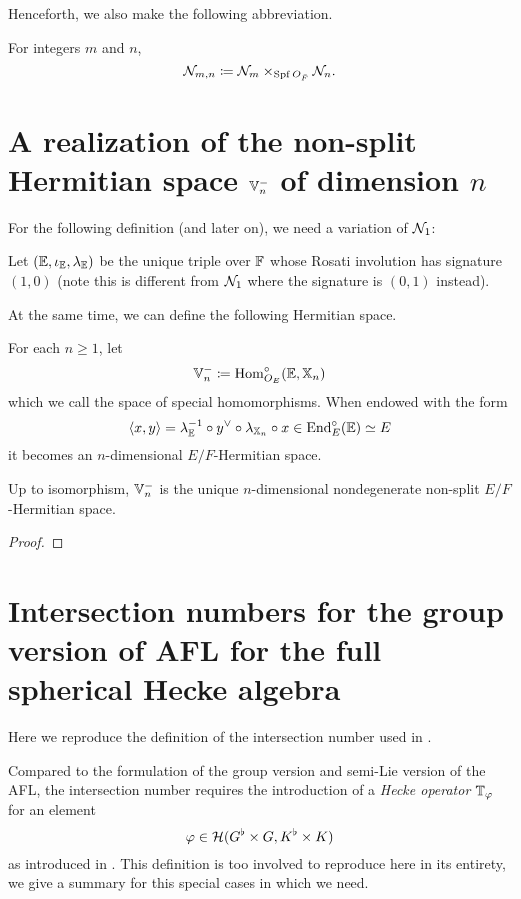 Henceforth, we also make the following abbreviation.
\begin{definition}
  For integers $m$ and $n$,
  \[ \mathcal N_{m,n} \coloneq \mathcal N_{m} \times_{\operatorname{Spf} O_{\breve F}} \mathcal N_n. \]
\end{definition}

\section{A realization of the non-split Hermitian space $\mathbb V_n^-$ of dimension $n$}
For the following definition (and later on), we need a variation of $\mathcal N_1$:
\begin{definition}
  Let $(\mathbb E, \iota_\mathbb E, \lambda_\mathbb E)$ be the unique triple over $\mathbb F$
  whose Rosati involution has signature $(1,0)$
  (note this is different from $\mathcal N_1$ where the signature is $(0,1)$ instead).
\end{definition}

At the same time, we can define the following Hermitian space.
\begin{definition}
  For each $n \ge 1$, let
  \[ \mathbb V_n^- \coloneqq \operatorname{Hom}_{O_E}^\circ (\mathbb E, \mathbb X_n) \]
  which we call the space of special homomorphisms.
  When endowed with the form
  \[ \left< x,y \right> = \lambda_{\mathbb E}^{-1} \circ y^\vee \circ \lambda_{\mathbb X_n} \circ x
    \in \operatorname{End}_{E}^\circ(\mathbb E) \simeq E \]
  it becomes an $n$-dimensional $E/F$-Hermitian space.
  \label{def:VV_n_nonsplit}
\end{definition}
\begin{proposition}
  Up to isomorphism, $\mathbb V_n^-$ is the unique $n$-dimensional
  nondegenerate non-split $E/F$-Hermitian space.
\end{proposition}
\begin{proof}
\end{proof}

\section{Intersection numbers for the group version of AFL for the full spherical Hecke algebra}
Here we reproduce the definition of the intersection number used in .

Compared to the formulation of the group version and semi-Lie version of the AFL,
the intersection number requires the introduction of a
\emph{Hecke operator} $\mathbb T_{\varphi}$ for an element
\[ \varphi \in \mathcal H(G^\flat \times G, K^\flat \times K) \]
as introduced in \cite{ref:AFLspherical}.
This definition is too involved to reproduce here in its entirety,
we give a summary for this special cases in which we need.

